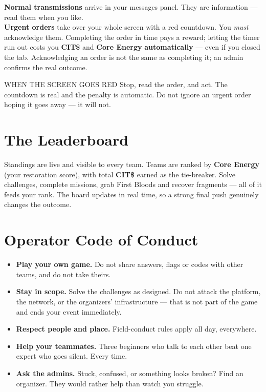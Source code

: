 \documentclass[11pt]{article}
\newcommand{\cit}{\textbf{\color{warn}CIT\$}}
\newcommand{\nrg}{\textbf{\color{info}Core Energy}}
\begin{document}
\begin{mypanel}
\textbf{\color{info}Normal transmissions} arrive in your messages panel.
They are information — read them when you like.\\[6pt]
\textbf{\color{alert}Urgent orders} take over your whole screen with a red
countdown. You \emph{must} acknowledge them. Completing the order in time pays
a reward; letting the timer run out costs you \cit{} and \nrg{}
\textbf{automatically} — even if you closed the tab. Acknowledging an order is
not the same as completing it; an admin confirms the real outcome.
\end{mypanel}

\begin{warnbox}{WHEN THE SCREEN GOES RED}
Stop, read the order, and act. The countdown is real and the penalty is
automatic. Do not ignore an urgent order hoping it goes away — it will not.
\end{warnbox}

\section{The Leaderboard}
Standings are live and visible to every team. Teams are ranked by \nrg{}
(your restoration score), with total \cit{} earned as the tie-breaker.
Solve challenges, complete missions, grab First Bloods and recover fragments —
all of it feeds your rank. The board updates in real time, so a strong final
push genuinely changes the outcome.

\section{Operator Code of Conduct}
\begin{mypanel}
\begin{itemize}
  \item \textbf{Play your own game.} Do not share answers, flags or codes with
        other teams, and do not take theirs.
  \item \textbf{Stay in scope.} Solve the challenges as designed. Do not attack
        the platform, the network, or the organizers' infrastructure — that is
        not part of the game and ends your event immediately.
  \item \textbf{Respect people and place.} Field-conduct rules apply all day,
        everywhere.
  \item \textbf{Help your teammates.} Three beginners who talk to each other
        beat one expert who goes silent. Every time.
  \item \textbf{Ask the admins.} Stuck, confused, or something looks broken?
        Find an organizer. They would rather help than watch you struggle.
\end{itemize}
\end{mypanel}
\end{document}
